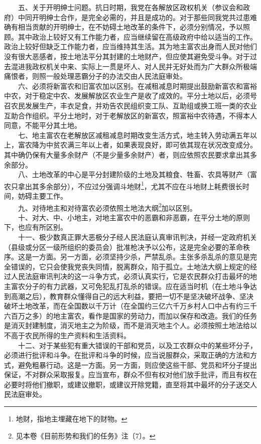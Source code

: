 \documentclass[cn,11pt,chinese]{elegantbook}
\begin{document}
　　五、关于开明绅士问题。抗日时期，我党在各解放区政权机关（参议会和政府）中同开明绅士合作，是完全必需的，并且是成功的。对于那些同我党共过患难确有相当贡献的开明绅士，在不妨碍土地改革的条件下，必须分别情况，予以照顾。其中政治上较好又有工作能力者，应当继续留在高级政府中给以适当的工作。政治上较好但缺乏工作能力者，应当维持其生活。其为地主富农出身而人民对他们没有很大恶感者，按土地法平分其封建的土地财产，但应使其避免受斗争。对于过去混进我政权机关中来、实际上一贯是坏人、对人民并无好处而为广大群众所极端痛恨者，则照一般处理恶霸分子的办法交由人民法庭审处。\\
　　六、必须将新富农和旧富农加以区别。在减租减息时期提出鼓励新富农和富裕中农，对于稳定中农、发展解放区农业生产是收了成效的。平分土地以后，必须号召农民发展生产，丰衣足食，并劝告农民组织变工队、互助组或换工班一类的农业互助合作组织。平分土地时，对于老解放区的新富农，照富裕中农待遇，不得本人同意，不能平分其土地。\\
　　七、地主富农在老解放区减租减息时期改变生活方式，地主转入劳动满五年以上，富农降为中贫农满三年以上者，如果表现良好，即可依其现在状况改变成分。其中确仍保有大量多余财产（不是少量多余财产）者，则应依照农民要求拿出其多余部分。\\
　　八、土地改革的中心是平分封建阶级的土地及其粮食、牲畜、农具等财产（富农只拿出其多余部分），不应过分强调斗地财\footnote[2]{ 地财，指地主埋藏在地下的财物。}，尤其不应在斗地财上耗费很长时间，妨碍主要工作。\\
　　九、对待地主和对待富农必须依照土地法大纲\footnote[3]{ 见本卷《目前形势和我们的任务》注〔7〕。}加以区别。\\
　　十、对大、中、小地主，对地主富农中的恶霸和非恶霸，在平分土地的原则下，也应有所区别。\\
　　十一、极少数真正罪大恶极分子经人民法庭认真审讯判决，并经一定政府机关（县级或分区一级所组织的委员会）批准枪决予以公布，这是完全必要的革命秩序。这是一方面。另一方面，必须坚持少杀，严禁乱杀。主张多杀乱杀的意见是完全错误的，它只会使我党丧失同情，脱离群众，陷于孤立。土地法大纲上规定的经过人民法庭审讯判决的这一斗争方式，必须认真实行，它是农民群众打击最坏的地主富农分子的有力武器，又可免犯乱打乱杀的错误。应在适当时机（在土地斗争达到高潮之后），教育群众懂得自己的远大利益，要把一切不是坚决破坏战争、坚决破坏土地改革，而在全国数以千万计（在全国约三亿六千万乡村人口中占有约三千六百万之多）的地主富农，看作是国家的劳动力，而加以保存和改造。我们的任务是消灭封建制度，消灭地主之为阶级，而不是消灭地主个人。必须按照土地法给以不高于农民所得的生产资料和生活资料。\\
　　十二、对于某些犯有重大错误的干部和党员，以及工农群众中的某些坏分子，必须进行批评和斗争。在批评和斗争的时候，应当说服群众，采取正确的方法和方式，避免粗暴行动。这是一方面。另一方面，则应使这些干部、党员和坏分子提出保证，不对群众采取报复。应当宣布，群众不但有权对他们放手批评，而且有权在必要时将他们撤职，或建议撤职，或建议开除党籍，直至将其中最坏的分子送交人民法庭审处。\\
\end{document}
